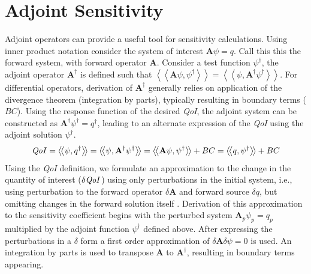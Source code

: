 \documentclass[12pt]{report}
\newcommand{\braSN}{\left\langle \! \left\langle}
\newcommand{\ketSN}{\right\rangle \! \right\rangle}
\newcommand{\scalResp}{q^\dag}
\newcommand{\qoi}{{\it QoI}\xspace}
\begin{document}
\section{Adjoint Sensitivity}

Adjoint operators can provide a useful tool for sensitivity calculations. Using inner product 
notation consider the system of interest $\mathbf{A} \psi = q$. Call this this 
the forward system, with forward operator $\mathbf{A}$. Consider a test function $\psi^\dag$, the 
adjoint operator $\mathbf{A^\dag}$ is defined such that $\braSN \mathbf{A} \psi, \psi^\dag \ketSN = \braSN \psi, 
\mathbf{A^\dag} \psi^\dag \ketSN $. For differential operators, derivation of $\mathbf{A^\dag}$ generally relies on 
application of the divergence theorem (integration by parts), typically resulting in boundary 
terms ($BC$). Using the response function of the desired \qoi, the adjoint system can be constructed 
as $\mathbf{A^\dag} \psi^\dag = q^\dag$, leading to an alternate expression of the \qoi using the 
adjoint solution $\psi^\dag $.
\begin{equation}
\label{genAdjQoI}
\qoi = \braSN \psi, \scalResp \ketSN 
= \braSN \psi, \mathbf{A^\dag} \psi^\dag \ketSN 
= \braSN \mathbf{A} \psi, \psi^\dag \ketSN + BC
= \braSN q , \psi^\dag \ketSN + BC
\end{equation} 
Using the \qoi definition, we formulate an approximation to the change in the quantity of interest ($\delta \qoi$) using only perturbations in the initial system, i.e., using perturbation to the forward 
operator $\delta \mathbf{A}$ and forward source $\delta q$, but omitting changes in the forward solution itself \cite{Marchuk}.  Derivation of this approximation to the sensitivity coefficient begins with the perturbed system $\mathbf{A}_p \psi_p = q_p$ multiplied by the adjoint function $\psi^\dag$ defined above. After expressing the perturbations in a $\delta$ form a first order approximation of $\delta \mathbf{A} \delta \psi = 0$ is used. An integration by parts is used to transpose $\mathbf{A}$ to $\mathbf{A^\dag}$, resulting in boundary terms appearing. 
\end{document}
